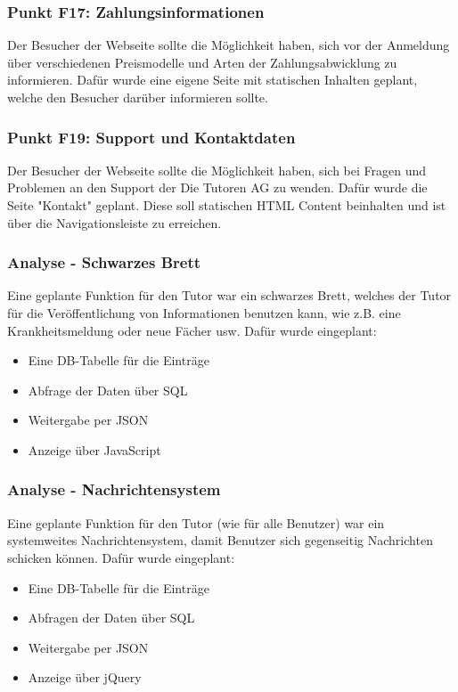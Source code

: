 \begin{frame}
  	\frametitle{Punkt F17: Zahlungsinformationen}
  
  	Der Besucher der Webseite sollte die Möglichkeit haben, sich vor der Anmeldung über verschiedenen Preismodelle und Arten der Zahlungsabwicklung zu informieren.
  	\newline Dafür wurde eine eigene Seite mit statischen Inhalten geplant, welche den Besucher darüber informieren sollte.
\end{frame}

\begin{frame}
  	\frametitle{Punkt F19: Support und Kontaktdaten}
  
  	Der Besucher der Webseite sollte die Möglichkeit haben, sich bei Fragen und Problemen an den Support der Die Tutoren AG zu wenden.
  	\newline Dafür wurde die Seite "Kontakt" geplant. Diese soll statischen HTML Content beinhalten und ist über die Navigationsleiste zu erreichen.
\end{frame}

\begin{frame}
  	\frametitle{Analyse - Schwarzes Brett}
  
	Eine geplante Funktion für den Tutor war ein schwarzes Brett, welches der Tutor für die Veröffentlichung von Informationen benutzen kann, wie z.B. eine Krankheitsmeldung oder neue Fächer usw. \newline
	Dafür wurde eingeplant:
	\begin{itemize}
		\item Eine DB-Tabelle für die Einträge
		\item Abfrage der Daten über SQL
		\item Weitergabe per JSON
		\item Anzeige über JavaScript
	\end{itemize}
	
\end{frame}

\begin{frame}
 	\frametitle{Analyse - Nachrichtensystem}

	Eine geplante Funktion für den Tutor (wie für alle Benutzer) war ein systemweites Nachrichtensystem, damit Benutzer sich gegenseitig Nachrichten schicken können. \newline
	Dafür wurde eingeplant:
	\begin{itemize}
		\item Eine DB-Tabelle für die Einträge
		\item Abfragen der Daten über SQL
		\item Weitergabe per JSON
		\item Anzeige über jQuery
	\end{itemize}
	
\end{frame}
